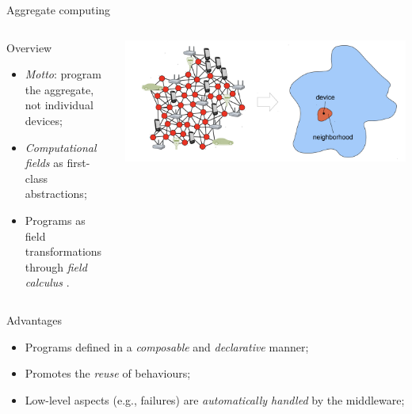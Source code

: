 \documentclass[presentation]{beamer}\mode<presentation>{\usetheme{AMSBolognaFC}}
\begin{document}
\begin{frame}{Aggregate computing}
\begin{columns}
	\begin{column}{0.55\textwidth}
		\begin{block}{Overview}
			\begin{itemize}
				\item \emph{Motto}: program the aggregate, not individual devices;
				\item \emph{Computational fields} \cite{mamei2004cofields, viroli2019distributed} as first-class abstractions;
				\item Programs as field transformations through \emph{field calculus} \cite{viroli2016higher}.
			\end{itemize}
		\end{block}
	\end{column}
	\begin{column}{0.45\textwidth}
	\includegraphics[width=\textwidth]{img/ac.png}
	\end{column}
\end{columns}
	
\centering

\begin{alertblock}{Advantages}
	 	\begin{itemize}
	 		\item Programs defined in a \emph{composable} and \emph{declarative} manner;
	 		\item Promotes the \emph{reuse} of behaviours;
	 		\item Low-level aspects (e.g., failures) are \emph{automatically handled} by the middleware;
	 	\end{itemize}
\end{alertblock}


\end{frame}
\end{document}
